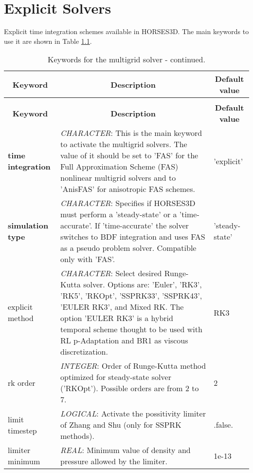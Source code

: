 \documentclass[a4paper,10pt]{report}
\begin{document}

\chapter{Explicit Solvers}

Explicit time integration schemes available in HORSES3D.
The main keywords to use it are shown in Table \ref{tab:explicitKey}.

\begin{longtable}{|p{4cm}|p{10cm}|p{2.2cm}|}
\caption{Keywords for the multigrid solver.} \label{tab:explicitKey} \\
\hline
\multicolumn{1}{|c|}{\textbf{Keyword}} & \multicolumn{1}{c|}{\textbf{Description}} & \multicolumn{1}{c|}{\textbf{Default value}} \\ \hline
\endfirsthead

\caption{Keywords for the multigrid solver - continued.} \\
\hline
\multicolumn{1}{|c|}{\textbf{Keyword}} & \multicolumn{1}{c|}{\textbf{Description}} & \multicolumn{1}{c|}{\textbf{Default value}} \\ \hline
\endhead

\textbf{time integration} & \textit{CHARACTER}: This is the main keyword to activate the multigrid solvers. The value of it should be set to 'FAS' for the Full Approximation Scheme (FAS) nonlinear multigrid  solvers and to 'AnisFAS' for anisotropic FAS schemes. & 'explicit' \\ \hline

\textbf{simulation type} & \textit{CHARACTER}: Specifies if HORSES3D must perform a ’steady-state’ or a ’time-accurate’. If 'time-accurate' the solver switches to BDF integration and uses FAS as a pseudo problem solver. Compatible only with 'FAS'. & 'steady-state' \\ \hline

explicit method & \textit{CHARACTER}: Select desired Runge-Kutta solver. Options are: 'Euler', 'RK3', 'RK5', 'RKOpt', 'SSPRK33',  'SSPRK43', 'EULER RK3', and Mixed RK. The option 'EULER RK3' is a hybrid temporal scheme thought to be used with RL p-Adaptation and BR1 as viscous discretization. & RK3 \\ \hline

rk order & \textit{INTEGER}: Order of Runge-Kutta method optimized for steady-state solver ('RKOpt'). Possible orders are from 2 to 7. & 2 \\ \hline

limit timestep & \textit{LOGICAL}: Activate the possitivity limiter of Zhang and Shu (only for SSPRK methods). & .false. \\ \hline

limiter minimum & \textit{REAL}: Minimum value of density and pressure allowed by the limiter. & 1e-13 \\ \hline

\end{longtable}
\end{document}
